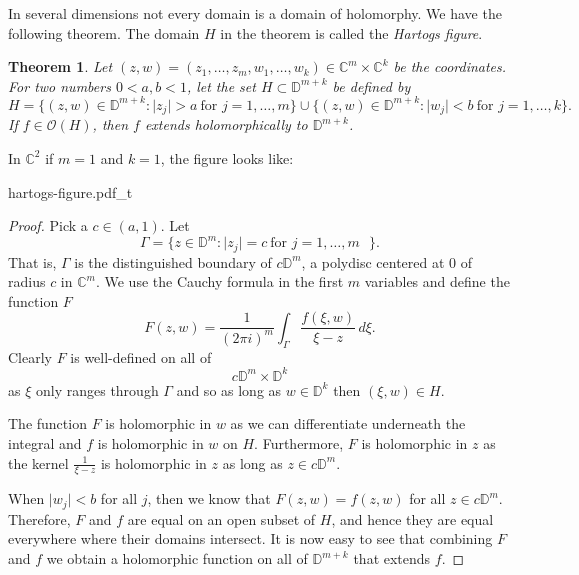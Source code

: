 \documentclass[12pt,openany]{book}
\newcommand{\sabs}[1]{\lvert {#1} \rvert}
\newcommand{\C}{{\mathbb{C}}}
\newcommand{\D}{{\mathbb{D}}}
\newcommand{\sO}{{\mathscr{O}}}
\newcommand{\myindex}[1]{#1\index{#1}}
\theoremstyle{plain}
\newtheorem{thm}{Theorem}[section]
\theoremstyle{remark}
\theoremstyle{definition}
\theoremstyle{exercise}
\theoremstyle{example}
\begin{document}
In several dimensions not every domain is a domain of holomorphy.  We have
the following theorem.  The domain $H$ in the theorem is called the
\emph{\myindex{Hartogs figure}}.

\begin{thm} \label{thm:extensionhartogsfigure}
Let $(z,w) = (z_1,\ldots,z_m,w_{1},\ldots,w_{k}) \in \C^m \times \C^k$ be the coordinates.  For two numbers
$0 < a,b < 1$, let the set $H \subset \D^{m+k}$
be defined by
\begin{equation*}
H = \bigl\{ (z,w) \in \D^{m+k} : \sabs{z_j} > a ~\text{for $j=1,\ldots,m$}
\bigr\} \cup
\bigl\{ (z,w) \in \D^{m+k} : \sabs{w_j} < b ~\text{for $j=1,\ldots,k$}
\bigr\} .
\end{equation*}
If $f \in \sO(H)$, then $f$ extends holomorphically to $\D^{m+k}$.
\end{thm}

\begin{samepage}
In $\C^2$ if $m=1$ and $k=1$, the figure looks like:


\newcommand{\hartogstext}{\parbox[t]{2.5in}{In diagrams, often the Hartogs figure is
drawn as:}}
\begin{center}
{hartogs-figure.pdf_t}
\end{center}
\end{samepage}



\begin{proof}
Pick a $c \in (a,1)$.  Let
\begin{equation*}
\Gamma =
\bigl\{ z \in \D^{m} : \sabs{z_j} = c ~\text{for $j=1,\ldots,m$ } \bigr\}.
\end{equation*}
That is, $\Gamma$ is the distinguished boundary of $c \D^m$,
a polydisc centered at 0 of radius $c$ in $\C^m$.
We use the Cauchy formula in the first $m$ variables and
define the function $F$
\begin{equation*}
F(z,w)
=
\frac{1}{{(2\pi i)}^m}
\int_\Gamma \frac{f(\xi,w)}{\xi-z} \, d\xi .
\end{equation*}
Clearly $F$ is well-defined on all of
\begin{equation*}
c\D^m \times \D^k
\end{equation*}
as $\xi$ only
ranges through $\Gamma$ and so as long as $w \in \D^k$ then $(\xi,w) \in H$.

The function $F$ is holomorphic in $w$ as we can differentiate
underneath the integral and $f$ is holomorphic in $w$ on $H$.  Furthermore,
$F$ is holomorphic in $z$ as the kernel $\frac{1}{\xi-z}$ is holomorphic in
$z$ as long as $z \in c\D^m$.

When $\sabs{w_j} < b$ for all $j$, then we know that $F(z,w) = f(z,w)$
for all $z \in c \D^m$.  Therefore, $F$ and $f$ are equal on an open subset
of $H$, and hence they are equal everywhere where their domains intersect.
It is now easy to see that combining $F$ and $f$ we obtain a holomorphic
function on all of $\D^{m+k}$ that extends $f$.
\end{proof}
\end{document}
